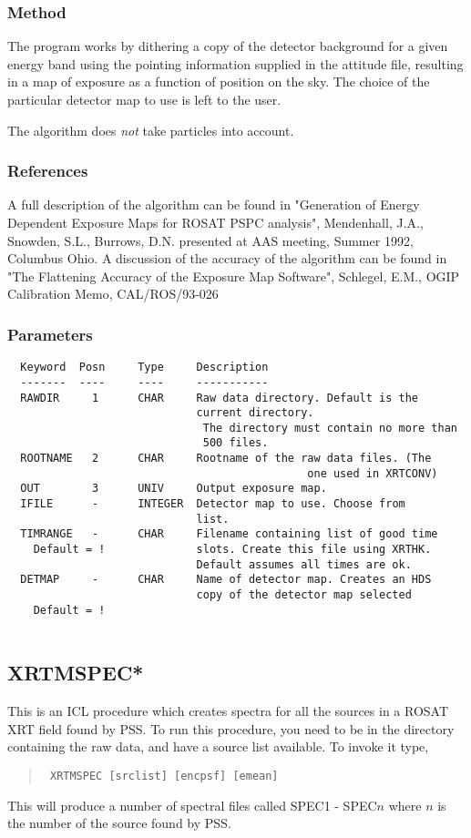 \documentclass{book}
\renewcommand{\_}{{\tt\char'137}}     %
\begin{document}
\subsubsection{Method}
The program works by dithering a copy of the detector background for
a given energy band using the pointing information supplied in the
attitude file, resulting in a map of exposure as a function of
position on the sky. The choice of the particular detector map to use
is left to the user.
 
The algorithm does {\em not} take particles into account.
 
\subsubsection{References}
A full description of the algorithm can be found in
"Generation of Energy Dependent Exposure Maps for
ROSAT PSPC analysis", Mendenhall, J.A., Snowden, S.L., Burrows, D.N.
presented at AAS meeting, Summer 1992, Columbus Ohio.
A discussion of the accuracy of the algorithm can be found in
"The Flattening Accuracy of the Exposure Map Software",
Schlegel, E.M., OGIP Calibration Memo, CAL/ROS/93-026
\subsubsection{Parameters}
\begin{verbatim}
  Keyword  Posn     Type     Description
  -------  ----     ----     -----------
  RAWDIR     1      CHAR     Raw data directory. Default is the
                             current directory.
                              The directory must contain no more than
                              500 files.
  ROOTNAME   2      CHAR     Rootname of the raw data files. (The
                                              one used in XRTCONV)
  OUT        3      UNIV     Output exposure map.
  IFILE      -      INTEGER  Detector map to use. Choose from
                             list.
  TIMRANGE   -      CHAR     Filename containing list of good time
    Default = !              slots. Create this file using XRTHK.
                             Default assumes all times are ok.
  DETMAP     -      CHAR     Name of detector map. Creates an HDS
                             copy of the detector map selected
    Default = !
 
\end{verbatim}\subsection{XRTMSPEC*}
This is an ICL procedure which creates spectra for all the sources
in a ROSAT XRT field found by PSS. To run this procedure, you need
to be in the directory containing the raw data, and have a source
list available.
To invoke it type,
\begin{quote}\begin{verbatim}
 XRTMSPEC [srclist] [encpsf] [emean]
\end{verbatim}\end{quote}
This will produce a number of spectral files called SPEC1 -
SPEC$n$
where $n$ is the number of the source found by PSS.
 
\end{document}
